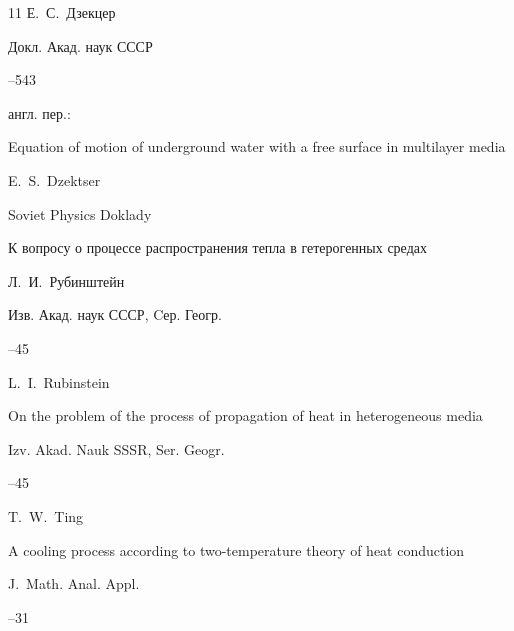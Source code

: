 {\begin{thebibliography}{11}
\by Е.~С.~Дзекцер

\jour Докл. Акад. наук СССР 




--543

\transl англ. пер.:~

\paper Equation of motion of underground water with a free surface in multilayer media

\by E.~S.~Dzektser

\jour Soviet Physics Doklady









\paper  К вопросу о процессе распространения тепла в гетерогенных средах 

\by Л.~И.~Рубинштейн

\jour Изв. Акад. наук СССР, Cер. Геогр.




--45

\misctransl

\by L.~I.~Rubinstein  

\paper On the problem of the process of propagation of heat in heterogeneous media

\jour Izv. Akad. Nauk SSSR, Ser. Geogr.




--45






\by T.~W.~Ting

\paper A cooling process according to two-temperature theory of heat conduction

\jour J.~Math. Anal. Appl.




–31






\end{thebibliography}}
